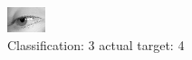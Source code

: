 \begin{figure}[h!]
\begin{center}
\includegraphics[width=0.60\columnwidth]{figures/ID2953_class_3_target_4.png}
\end{center}
\caption{ Classification: 3 actual target: 4}
\label{fig:ID2953_class_3_target_4}
\end{figure}

